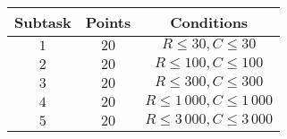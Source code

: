 \begin{tabular}{ | c | c | c | } \hline
    \bf{Subtask } &    \bf{Points} &    \bf{Conditions} \\ \hline
    $1$ & $20$ & $ R \le 30, C \le 30 $\\ \hline
    $2$ & $20$ & $ R \le 100, C \le 100 $\\ \hline
    $3$ & $20$ & $ R \le 300, C \le 300 $\\ \hline
    $4$ & $20$ & $ R \le 1\,000, C \le 1\,000 $\\ \hline
    $5$ & $20$ & $ R \le 3\,000, C \le 3\,000 $\\ \hline
\end{tabular}